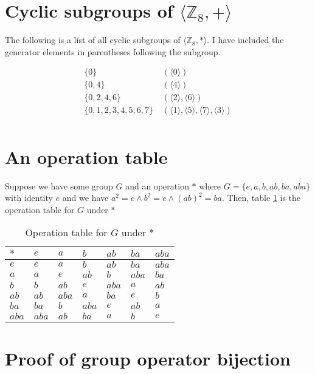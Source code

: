 \documentclass[12pt]{article}
\newcommand{\ints}{\mathbb{Z}}
\begin{document}
\section{Cyclic subgroups of $\langle \ints_8, + \rangle $}

The following is a list of all cyclic subgroups of $\langle \ints_8, * \rangle$.
I have included the generator elements in parentheses following the subgroup.

\begin{align}
	\{ 0 \} & \; ( \langle 0 \rangle) \\
	\{ 0, 4 \} & \; ( \langle 4 \rangle) \\
	\{ 0, 2, 4, 6 \} & \; ( \langle 2 \rangle, \langle 6 \rangle) \\
	\{ 0, 1, 2, 3, 4, 5, 6, 7 \} & \;
	( \langle 1 \rangle, \langle 5 \rangle, \langle 7 \rangle, \langle 3 \rangle ) \\
\end{align}

\pagebreak
\section{An operation table}

	Suppose we have some group $G$ and an operation $*$
	where $G = \{ e, a, b, ab, ba, aba \}$ with identity $e$
	and we have $a^2 = e \land b^2 = e \land (ab)^2 = ba$.
	Then, table \ref{t2} is the operation table for $G$ under $*$

\begin{table}[!ht] 
\begin{tabular}{l|llllll}
	$*$ & $e$ & $a$ & $b$ & $ab$ & $ba$ & $aba$	\\ \hline
	$e$ & $e$ & $a$ & $b$ & $ab$ & $ba$ & $aba$    	\\
	$a$ & $a$ & $e$ & $ab$ & $b$ & $aba$ & $ba$ 	\\
	$b$ & $b$ & $ab$ & $e$ & $aba$ & $a$ & $ab$ 	\\
	$ab$ & $ab$ & $aba$ & $a$ & $ba$ & $e$ & $b$ 	\\
	$ba$ & $ba$ & $b$ & $aba$ & $e$ & $ab$ & $a$ 	\\
	$aba$ & $aba$ & $ab$ & $ba$ & $a$ & $b$ & $e$	\\
\end{tabular}
\centering
\caption{Operation table for $G$ under $*$}
\label{t2}
\end{table}

\section{Proof of group operator bijection}
\end{document}
